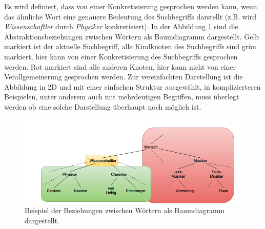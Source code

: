 \documentclass[12pt,a4paper]{report}
\begin{document}
				Es wird definiert, dass von einer Konkretisierung gesprochen werden kann, wenn das ähnliche Wort eine genauere Bedeutung des Suchbegriffs darstellt (z.B. wird \textit{Wissenschaftler} durch \textit{Physiker} konkretisiert). In der Abbildung \ref{pic:Konkretisierung} sind die Abstraktionsbeziehungen zwischen Wörtern als Baumdiagramm dargestellt. Gelb markiert ist der aktuelle Suchbegriff, alle Kindknoten des Suchbegriffs sind grün markiert, hier kann von einer Konkretisierung des Suchbegriffs gesprochen werden. Rot markiert sind alle anderen Knoten, hier kann nicht von einer Verallgemeinerung gesprochen werden. Zur vereinfachten Darstellung ist die Abbildung in 2D und mit einer einfachen Struktur ausgewählt, in komplizierteren Beispielen, unter anderem auch mit mehrdeutigen Begriffen, muss überlegt werden ob eine solche Darstellung überhaupt noch möglich ist.\\
		
\begin{figure}[h]
  \begin{center}
	\includegraphics[scale=0.55]{Konkretisierung_Baum2.png}
  \end{center}  
  \caption{Beispiel der Beziehungen zwischen Wörtern als Baumdiagramm dargestellt.}
  \label{pic:Konkretisierung}
\end{figure}
		
\end{document}
